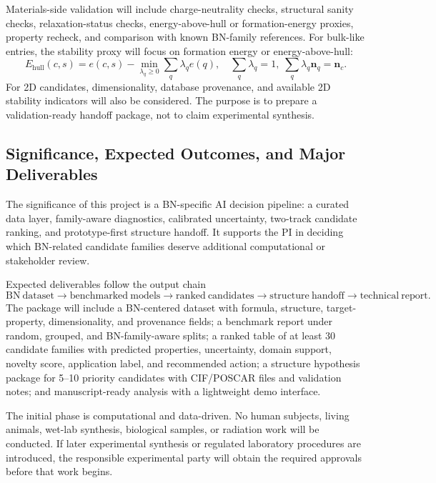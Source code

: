 \documentclass[12pt,a4paper]{article}
\newcommand{\ehull}{E_{\mathrm{hull}}}
\begin{document}
Materials-side validation will include charge-neutrality checks, structural sanity checks, relaxation-status checks, energy-above-hull or formation-energy proxies, property recheck, and comparison with known BN-family references. For bulk-like entries, the stability proxy will focus on formation energy or energy-above-hull:
\begin{equation}
  \ehull(c,s)=e(c,s)-
  \min_{\lambda_q\ge0}\sum_q\lambda_q e(q),
  \quad \sum_q\lambda_q=1,\;\sum_q\lambda_q\mathbf{n}_q=\mathbf{n}_c.
\end{equation}
For 2D candidates, dimensionality, database provenance, and available 2D stability indicators will also be considered. The purpose is to prepare a validation-ready handoff package, not to claim experimental synthesis.

\vspace{-10pt}
\subsection{Significance, Expected Outcomes, and Major Deliverables}
\label{sec:significance}
The significance of this project is a BN-specific AI decision pipeline: a curated data layer, family-aware diagnostics, calibrated uncertainty, two-track candidate ranking, and prototype-first structure handoff. It supports the PI in deciding which BN-related candidate families deserve additional computational or stakeholder review.

Expected deliverables follow the output chain
\begin{equation}
  \mathrm{BN\ dataset}\rightarrow\mathrm{benchmarked\ models}\rightarrow
  \mathrm{ranked\ candidates}\rightarrow\mathrm{structure\ handoff}\rightarrow
  \mathrm{technical\ report}.
\end{equation}
The package will include a BN-centered dataset with formula, structure, target-property, dimensionality, and provenance fields; a benchmark report under random, grouped, and BN-family-aware splits; a ranked table of at least 30 candidate families with predicted properties, uncertainty, domain support, novelty score, application label, and recommended action; a structure hypothesis package for 5--10 priority candidates with CIF/POSCAR files and validation notes; and manuscript-ready analysis with a lightweight demo interface.

The initial phase is computational and data-driven. No human subjects, living animals, wet-lab synthesis, biological samples, or radiation work will be conducted. If later experimental synthesis or regulated laboratory procedures are introduced, the responsible experimental party will obtain the required approvals before that work begins.
\end{document}
